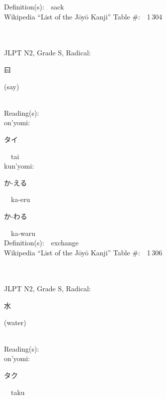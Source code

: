 \begin{multicols}{2}
Definition(s):\ \ sack \\
Wikipedia ``List of the J\=oy\=o Kanji'' Table \#:\ \ 1\,304 \\
\ \ \\
{\fontsize{34pt}{40pt}  }\ \ \\  %
{JLPT N2, Grade S, Radical:\ \ {\begin{CJK}{UTF8}{min} 曰 \end{CJK}} (say) } \\
Reading(s):\ \ \\
{\hspace*{1em}}on'yomi:\ \ \\
{\hspace*{2em}}{\begin{CJK}{UTF8}{min} タイ \end{CJK}}\ \ tai\ \ \\
{\hspace*{1em}}kun'yomi:\ \ \\
{\hspace*{2em}}{\begin{CJK}{UTF8}{min} か-える \end{CJK}}\ \ ka-eru\ \ \\
{\hspace*{2em}}{\begin{CJK}{UTF8}{min} か-わる \end{CJK}}\ \ ka-waru\ \ \\
Definition(s):\ \ exchange \\
Wikipedia ``List of the J\=oy\=o Kanji'' Table \#:\ \ 1\,306 \\
\ \ \\
{\fontsize{34pt}{40pt}  }\ \ \\  %
{JLPT N2, Grade S, Radical:\ \ {\begin{CJK}{UTF8}{min} 水 \end{CJK}} (water) } \\
Reading(s):\ \ \\
{\hspace*{1em}}on'yomi:\ \ \\
{\hspace*{2em}}{\begin{CJK}{UTF8}{min} タク \end{CJK}}\ \ taku\ \ \\

\end{multicols}
